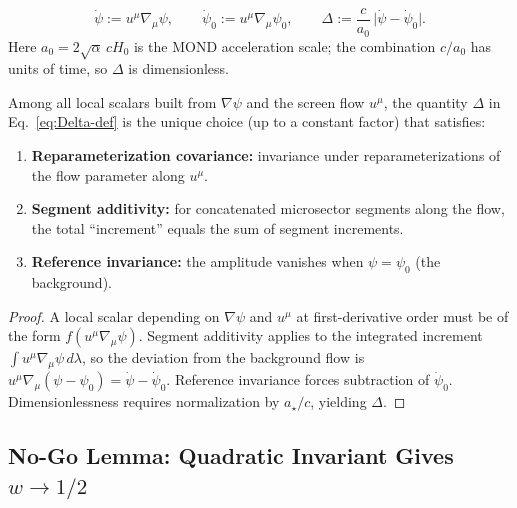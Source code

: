 \begin{definition}\label{def:temporal-increment}
\begin{equation}
\dot{\psi}:=u^\mu\nabla_\mu\psi,\qquad
\dot{\psi}_0:=u^\mu\nabla_\mu\psi_0,\qquad
\Delta:=\frac{c}{a_0}\,\bigl|\dot{\psi}-\dot{\psi}_0\bigr|.
\label{eq:Delta-def}
\end{equation}
Here $a_0 = 2\sqrt{\alpha}\,cH_0$ is the MOND acceleration scale; the combination $c/a_0$ has units of time, so $\Delta$ is dimensionless.
\end{definition}

\begin{theorem}\label{thm:segment-id}
Among all local scalars built from $\nabla\psi$ and the screen flow $u^\mu$, the quantity $\Delta$ in Eq.~\eqref{eq:Delta-def} is the unique choice (up to a constant factor) that satisfies:
\begin{enumerate}
\item \textbf{Reparameterization covariance:} invariance under reparameterizations of the flow parameter along $u^\mu$.
\item \textbf{Segment additivity:} for concatenated microsector segments along the flow, the total ``increment'' equals the sum of segment increments.
\item \textbf{Reference invariance:} the amplitude vanishes when $\psi = \psi_0$ (the background).
\end{enumerate}
\end{theorem}

\begin{proof}
A local scalar depending on $\nabla\psi$ and $u^\mu$ at first-derivative order must be of the form $f(u^\mu\nabla_\mu\psi)$.
Segment additivity applies to the integrated increment $\int u^\mu\nabla_\mu\psi\,d\lambda$,
so the deviation from the background flow is $u^\mu\nabla_\mu(\psi-\psi_0)=\dot\psi-\dot\psi_0$.
Reference invariance forces subtraction of $\dot\psi_0$.
Dimensionlessness requires normalization by $a_\star/c$, yielding $\Delta$.
\end{proof}

\subsection{No-Go Lemma: Quadratic Invariant Gives $w \to 1/2$}

